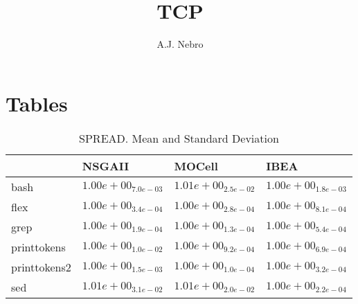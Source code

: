 \documentclass{article}
\title{TCP}
\author{A.J. Nebro}
\begin{document}
\maketitle
\section{Tables}

\begin{table}
\caption{SPREAD. Mean and Standard Deviation}
\label{table: SPREAD}
\centering
\begin{scriptsize}
\begin{tabular}{llll}
\hline & NSGAII & MOCell &  IBEA\\
\hline 
bash & \cellcolor{gray25}$  1.00e+00_{ 7.0e-03}$ & $  1.01e+00_{ 2.5e-02}$ & \cellcolor{gray95}$  1.00e+00_{ 1.8e-03}$ \\
flex & \cellcolor{gray25}$  1.00e+00_{ 3.4e-04}$ & $  1.00e+00_{ 2.8e-04}$ & \cellcolor{gray95}$  1.00e+00_{ 8.1e-04}$ \\
grep & $  1.00e+00_{ 1.9e-04}$ & \cellcolor{gray25}$  1.00e+00_{ 1.3e-04}$ & \cellcolor{gray95}$  1.00e+00_{ 5.4e-04}$ \\
printtokens & $  1.00e+00_{ 1.0e-02}$ & \cellcolor{gray95}$  1.00e+00_{ 9.2e-04}$ & \cellcolor{gray25}$  1.00e+00_{ 6.9e-04}$ \\
printtokens2 & $  1.00e+00_{ 1.5e-03}$ & \cellcolor{gray95}$  1.00e+00_{ 1.0e-04}$ & \cellcolor{gray25}$  1.00e+00_{ 3.2e-04}$ \\
sed & $  1.01e+00_{ 3.1e-02}$ & \cellcolor{gray25}$  1.01e+00_{ 2.0e-02}$ & \cellcolor{gray95}$  1.00e+00_{ 2.2e-04}$ \\
\hline
\end{tabular}
\end{scriptsize}
\end{table}
\end{document}
